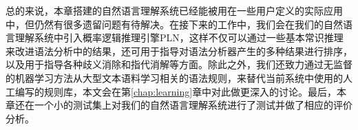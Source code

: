 总的来说，本章搭建的自然语言理解系统已经能被用在一些用户定义的实际应用中，但仍然有很多遗留问题有待解决。在接下来的工作中，我们会在我们的自然语言理解系统中引入概率逻辑推理引擎PLN，这样不仅可以通过一些基本常识推理来改进语法分析中的结果，还可用于指导对语法分析器产生的多种结果进行排序，以及用于指导各种歧义消除和指代消解等方面。除此之外，我们还致力通过无监督的机器学习方法从大型文本语料学习相关的语法规则，来替代当前系统中使用的人工编写的规则库，本文会在第\ref{chap:learning}章中对此做更深入的讨论。最后，本章还在一个小的测试集上对我们的自然语言理解系统进行了测试并做了相应的评价分析。




